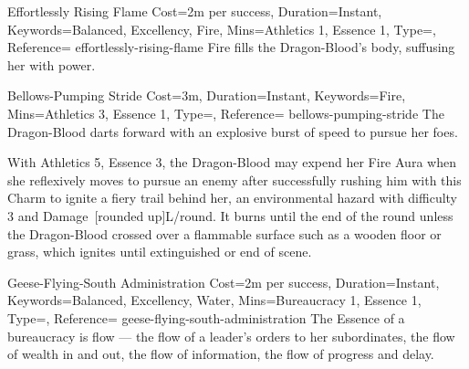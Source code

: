 

\begin{Charm}{Effortlessly Rising Flame}{%
    Cost=2m per success,
    Duration=Instant,
    Keywords={Balanced, Excellency, Fire},
    Mins={Athletics 1, Essence 1},
    Type=\SupplementalType,
    Reference=\cite*[p.~168]{db}
}{effortlessly-rising-flame}
    Fire fills the Dragon-Blood's body, suffusing her with power. 
\end{Charm}


\begin{Charm}{Bellows-Pumping Stride}{%
    Cost=3m,
    Duration=Instant,
    Keywords=Fire,
    Mins={Athletics 3, Essence 1},
    Type=\SupplementalType,
    Reference=\cite*[p.~168]{db}
}{bellows-pumping-stride}
    The Dragon-Blood darts forward with an explosive burst of speed to pursue her
    foes. 

    \begin{Unavailable}
        With Athletics 5, Essence 3, the Dragon-Blood may expend her Fire Aura when
        she reflexively moves to pursue an enemy after successfully rushing him with
        this Charm to ignite a fiery trail behind her, an environmental hazard with
        difficulty 3 and Damage~[rounded up]L/round. It burns
        until the end of the round unless the Dragon-Blood crossed over a flammable
        surface such as a wooden floor or grass, which ignites until extinguished or
        end of scene.
    \end{Unavailable}
\end{Charm}



\columnbreak
{}

\begin{Charm}{Geese-Flying-South Administration}{%
    Cost=2m per success,
    Duration=Instant,
    Keywords={Balanced, Excellency, Water},
    Mins={Bureaucracy 1, Essence 1},
    Type=\SupplementalType,
    Reference=\cite*[p.~181]{db}
}{geese-flying-south-administration}
    The Essence of a bureaucracy is flow --- the flow of a leader's orders to her
    subordinates, the flow of wealth in and out, the flow of information, the flow
    of progress and delay. 
\end{Charm}


